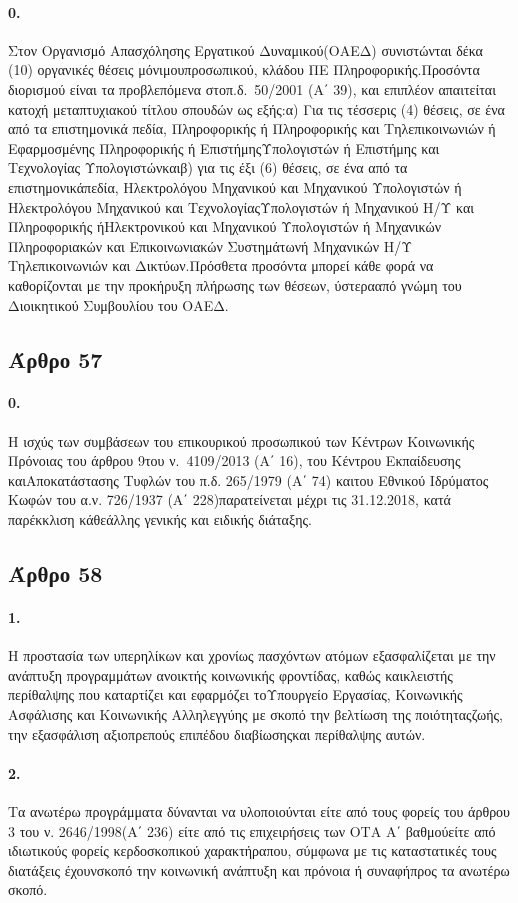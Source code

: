 \documentclass[a4paper,oneside, 10pt]{book}
\begin{document}
\paragraph { 0. } Στον Οργανισμό Απασχόλησης Εργατικού Δυναμικού(ΟΑΕΔ) συνιστώνται δέκα (10) οργανικές θέσεις μόνιμουπροσωπικού, κλάδου ΠΕ Πληροφορικής.Προσόντα διορισμού είναι τα προβλεπόμενα στοπ.δ. 50/2001 (Α΄ 39), και επιπλέον απαιτείται κατοχή μεταπτυχιακού τίτλου σπουδών ως εξής:α) Για τις τέσσερις (4) θέσεις, σε ένα από τα επιστημονικά πεδία, Πληροφορικής ή Πληροφορικής και Τηλεπικοινωνιών ή Εφαρμοσμένης Πληροφορικής ή ΕπιστήμηςΥπολογιστών ή Επιστήμης και Τεχνολογίας Υπολογιστώνκαιβ) για τις έξι (6) θέσεις, σε ένα από τα επιστημονικάπεδία, Ηλεκτρολόγου Μηχανικού και Μηχανικού Υπολογιστών ή Ηλεκτρολόγου Μηχανικού και ΤεχνολογίαςΥπολογιστών ή Μηχανικού Η/Υ και Πληροφορικής ήΗλεκτρονικού και Μηχανικού Υπολογιστών ή Μηχανικών Πληροφοριακών και Επικοινωνιακών Συστημάτωνή Μηχανικών Η/Υ Τηλεπικοινωνιών και Δικτύων.Πρόσθετα προσόντα μπορεί κάθε φορά να καθορίζονται με την προκήρυξη πλήρωσης των θέσεων, ύστερααπό γνώμη του Διοικητικού Συμβουλίου του ΟΑΕΔ.
\subsection*{ Άρθρο 57 }
\paragraph { 0. } Η ισχύς των συμβάσεων του επικουρικού προσωπικού των Κέντρων Κοινωνικής Πρόνοιας του άρθρου 9του ν. 4109/2013 (Α΄ 16), του Κέντρου Εκπαίδευσης καιΑποκατάστασης Τυφλών του π.δ. 265/1979 (Α΄ 74) καιτου Εθνικού Ιδρύματος Κωφών του α.ν. 726/1937 (Α΄ 228)παρατείνεται μέχρι τις 31.12.2018, κατά παρέκκλιση κάθεάλλης γενικής και ειδικής διάταξης.
\subsection*{ Άρθρο 58 }
\paragraph { 1. } Η προστασία των υπερηλίκων και χρονίως πασχόντων ατόμων εξασφαλίζεται με την ανάπτυξη προγραμμάτων ανοικτής κοινωνικής φροντίδας, καθώς καικλειστής περίθαλψης που καταρτίζει και εφαρμόζει τοΥπουργείο Εργασίας, Κοινωνικής Ασφάλισης και Κοινωνικής Αλληλεγγύης με σκοπό την βελτίωση της ποιότηταςζωής, την εξασφάλιση αξιοπρεπούς επιπέδου διαβίωσηςκαι περίθαλψης αυτών.
\paragraph { 2. } Τα ανωτέρω προγράμματα δύνανται να υλοποιούνται είτε από τους φορείς του άρθρου 3 του ν. 2646/1998(Α΄ 236) είτε από τις επιχειρήσεις των ΟΤΑ Α΄ βαθμούείτε από ιδιωτικούς φορείς κερδοσκοπικού χαρακτήραπου, σύμφωνα με τις καταστατικές τους διατάξεις έχουνσκοπό την κοινωνική ανάπτυξη και πρόνοια ή συναφήπρος τα ανωτέρω σκοπό.
\end{document}
